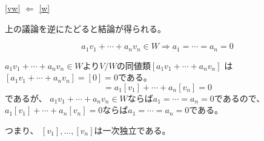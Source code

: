 \documentclass[12pt,b5paper]{ltjsarticle}
\begin{document}
\begin{enumerate}
      \ref{vw} $\Leftarrow$ \ref{w}

      上の議論を逆にたどると結論が得られる。

      \begin{equation}
       a_1v_1+\cdots+a_nv_n \in W
        \Rightarrow a_1=\cdots = a_n=0
      \end{equation}

      $a_1v_1+\cdots+a_nv_n \in W$より$V/W$の同値類$[a_1v_1+\cdots+a_nv_n]$
      は$[a_1v_1+\cdots+a_nv_n]=[0]=0$である。
      \begin{equation}
       [a_1v_1+\cdots+a_nv_n] = a_1[v_1]+\cdots + a_n[v_n] =0
      \end{equation}
      であるが、
      $a_1v_1+\cdots+a_nv_n \in W$ならば$a_1=\cdots =a_n=0$であるので、
      $a_1[v_1]+\cdots + a_n[v_n] =0$ならば$a_1=\cdots =a_n=0$である。

      つまり、
      $[v_1],\dots,[v_n]$は一次独立である。




\end{enumerate}
\end{document}
